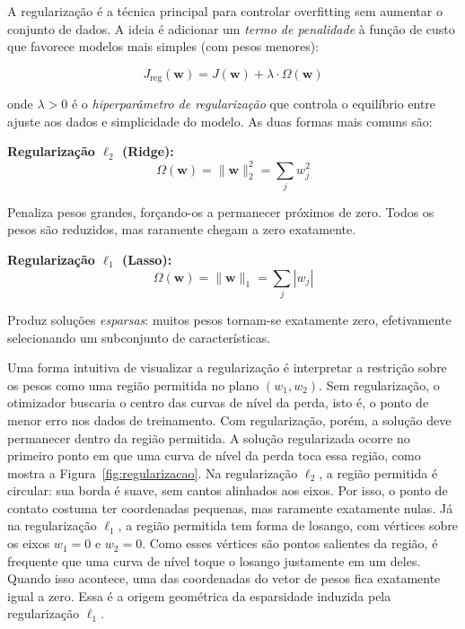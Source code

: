 \documentclass[12pt,a4paper]{article}
\begin{document}
A regularização é a técnica principal para controlar overfitting sem aumentar o conjunto de dados. A ideia é adicionar um \emph{termo de penalidade} à função de custo que favorece modelos mais simples (com pesos menores):

\[
J_{\text{reg}}(\mathbf{w}) = J(\mathbf{w}) + \lambda \cdot \Omega(\mathbf{w})
\]

onde $\lambda > 0$ é o \emph{hiperparâmetro de regularização} que controla o equilíbrio entre ajuste aos dados e simplicidade do modelo. As duas formas mais comuns são:

\medskip
\noindent\textbf{Regularização $\ell_2$ (Ridge):}
\[
\Omega(\mathbf{w}) = \|\mathbf{w}\|_2^2 = \sum_j w_j^2
\]

Penaliza pesos grandes, forçando-os a permanecer próximos de zero. Todos os pesos são reduzidos, mas raramente chegam a zero exatamente.

\medskip
\noindent\textbf{Regularização $\ell_1$ (Lasso):}
\[
\Omega(\mathbf{w}) = \|\mathbf{w}\|_1 = \sum_j |w_j|
\]

Produz soluções \emph{esparsas}: muitos pesos tornam-se exatamente zero, efetivamente selecionando um subconjunto de características.

Uma forma intuitiva de visualizar a regularização é interpretar a restrição sobre os pesos como uma região permitida no plano $(w_1,w_2)$. Sem regularização, o otimizador buscaria o centro das curvas de nível da perda, isto é, o ponto de menor erro nos dados de treinamento. Com regularização, porém, a solução deve permanecer dentro da região permitida. A solução regularizada ocorre no primeiro ponto em que uma curva de nível da perda toca essa região, como mostra a Figura~\ref{fig:regularizacao}. Na regularização $\ell_2$, a região permitida é circular: sua borda é suave, sem cantos alinhados aos eixos. Por isso, o ponto de contato costuma ter coordenadas pequenas, mas raramente exatamente nulas. Já na regularização $\ell_1$, a região permitida tem forma de losango, com vértices sobre os eixos $w_1=0$ e $w_2=0$. Como esses vértices são pontos salientes da região, é frequente que uma curva de nível toque o losango justamente em um deles. Quando isso acontece, uma das coordenadas do vetor de pesos fica exatamente igual a zero. Essa é a origem geométrica da esparsidade induzida pela regularização $\ell_1$.
\end{document}
